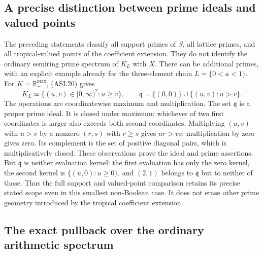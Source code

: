 \subsection{A precise distinction between prime ideals and valued points}

The preceding statements classify all support primes of $S$, all
lattice primes, and all tropical-valued points of the coefficient
extension. They do not identify the ordinary semiring prime spectrum
of $K_L$ with $X$. There can be additional primes, with an explicit
example already for the three-element chain $L=\{0<a<1\}$.
For $K=\mathbb R_+^{\max}$, (ASL20) gives
\begin{equation}\tag{ASL31}
 K_L\simeq\{(u,v)\in[0,\infty)^2:u\ge v\},\qquad
 \mathfrak q=\{(0,0)\}\cup\{(u,v):u>v\}.
\end{equation}
The operations are coordinatewise maximum and multiplication.
The set $\mathfrak q$ is a proper prime ideal. It is closed under
maximum: whichever of two first coordinates is larger also exceeds
both second coordinates. Multiplying $(u,v)$ with $u>v$ by a
nonzero $(r,s)$ with $r\ge s$ gives $ur>vs$; multiplication by zero
gives zero. Its complement is the set of positive diagonal pairs,
which is multiplicatively closed. These observations prove the ideal
and prime assertions. But $\mathfrak q$ is neither evaluation kernel:
the first evaluation has only the zero kernel, the second kernel is
$\{(u,0):u\ge0\}$, and $(2,1)$ belongs to $\mathfrak q$ but to
neither of those. Thus the full support and valued-point comparison
retains its precise stated scope even in this smallest non-Boolean
case. It does not erase other prime geometry introduced by the
tropical coefficient extension.

\subsection{The exact pullback over the ordinary arithmetic spectrum}

